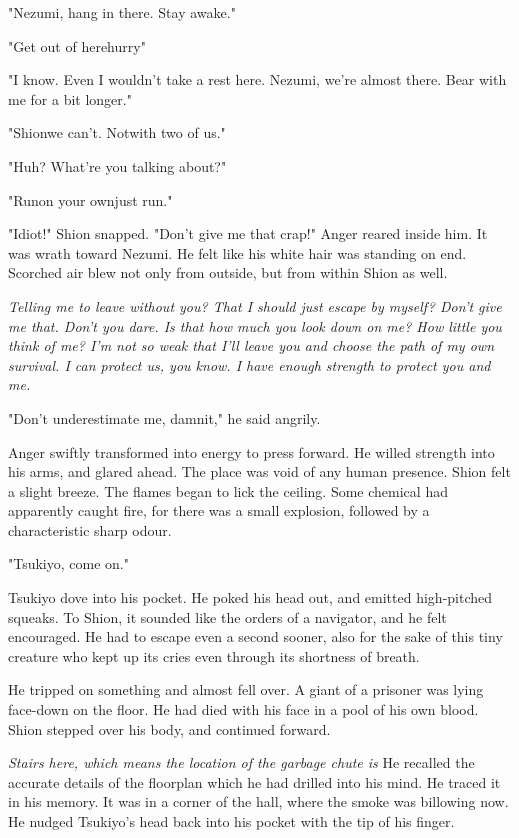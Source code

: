 "Nezumi, hang in there. Stay awake."

"\el Get out of here\el hurry\el "

"I know. Even I wouldn't take a rest here. Nezumi, we're almost there.
Bear with me for a bit longer."

"Shion\el we can't. Not\el with two of us."

"Huh? What're you talking about?"

"Run\el on your own\el just run."

"Idiot!" Shion snapped. "Don't give me that crap!" Anger reared inside
him. It was wrath toward Nezumi. He felt like his white hair was
standing on end. Scorched air blew not only from outside, but from
within Shion as well.

\emph{Telling me to leave without you? That I should just escape by myself?
Don't give me that. Don't you dare. Is that how much you look down on
me? How little you think of me? I'm not so weak that I'll leave you and
choose the path of my own survival. I can protect us, you know. I have
enough strength to protect you and me.}

"Don't underestimate me, damnit," he said angrily.

Anger swiftly transformed into energy to press forward. He willed
strength into his arms, and glared ahead. The place was void of any
human presence. Shion felt a slight breeze. The flames began to lick the
ceiling. Some chemical had apparently caught fire, for there was a small
explosion, followed by a characteristic sharp odour.

"Tsukiyo, come on."

Tsukiyo dove into his pocket. He poked his head out, and emitted
high-pitched squeaks. To Shion, it sounded like the orders of a
navigator, and he felt encouraged. He had to escape even a second
sooner, also for the sake of this tiny creature who kept up its cries
even through its shortness of breath.

He tripped on something and almost fell over. A giant of a prisoner was
lying face-down on the floor. He had died with his face in a pool of his
own blood. Shion stepped over his body, and continued forward.

\emph{Stairs here, which means the location of the garbage chute is\el } He
recalled the accurate details of the floorplan which he had drilled into
his mind. He traced it in his memory. It was in a corner of the hall,
where the smoke was billowing now. He nudged Tsukiyo's head back into
his pocket with the tip of his finger.

